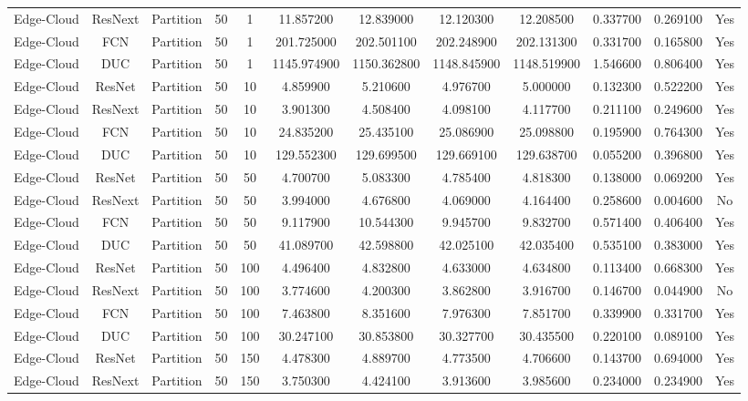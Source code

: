 \begin{tabular}{|c||c||c||c||c||c||c||c||c||c||c||c|}
Edge-Cloud & ResNext & Partition & 50 & 1 & 11.857200 & 12.839000 & 12.120300 & 12.208500 & 0.337700 & 0.269100 & Yes \\
Edge-Cloud & FCN & Partition & 50 & 1 & 201.725000 & 202.501100 & 202.248900 & 202.131300 & 0.331700 & 0.165800 & Yes \\
Edge-Cloud & DUC & Partition & 50 & 1 & 1145.974900 & 1150.362800 & 1148.845900 & 1148.519900 & 1.546600 & 0.806400 & Yes \\
Edge-Cloud & ResNet & Partition & 50 & 10 & 4.859900 & 5.210600 & 4.976700 & 5.000000 & 0.132300 & 0.522200 & Yes \\
Edge-Cloud & ResNext & Partition & 50 & 10 & 3.901300 & 4.508400 & 4.098100 & 4.117700 & 0.211100 & 0.249600 & Yes \\
Edge-Cloud & FCN & Partition & 50 & 10 & 24.835200 & 25.435100 & 25.086900 & 25.098800 & 0.195900 & 0.764300 & Yes \\
Edge-Cloud & DUC & Partition & 50 & 10 & 129.552300 & 129.699500 & 129.669100 & 129.638700 & 0.055200 & 0.396800 & Yes \\
Edge-Cloud & ResNet & Partition & 50 & 50 & 4.700700 & 5.083300 & 4.785400 & 4.818300 & 0.138000 & 0.069200 & Yes \\
Edge-Cloud & ResNext & Partition & 50 & 50 & 3.994000 & 4.676800 & 4.069000 & 4.164400 & 0.258600 & 0.004600 & No \\
Edge-Cloud & FCN & Partition & 50 & 50 & 9.117900 & 10.544300 & 9.945700 & 9.832700 & 0.571400 & 0.406400 & Yes \\
Edge-Cloud & DUC & Partition & 50 & 50 & 41.089700 & 42.598800 & 42.025100 & 42.035400 & 0.535100 & 0.383000 & Yes \\
Edge-Cloud & ResNet & Partition & 50 & 100 & 4.496400 & 4.832800 & 4.633000 & 4.634800 & 0.113400 & 0.668300 & Yes \\
Edge-Cloud & ResNext & Partition & 50 & 100 & 3.774600 & 4.200300 & 3.862800 & 3.916700 & 0.146700 & 0.044900 & No \\
Edge-Cloud & FCN & Partition & 50 & 100 & 7.463800 & 8.351600 & 7.976300 & 7.851700 & 0.339900 & 0.331700 & Yes \\
Edge-Cloud & DUC & Partition & 50 & 100 & 30.247100 & 30.853800 & 30.327700 & 30.435500 & 0.220100 & 0.089100 & Yes \\
Edge-Cloud & ResNet & Partition & 50 & 150 & 4.478300 & 4.889700 & 4.773500 & 4.706600 & 0.143700 & 0.694000 & Yes \\
Edge-Cloud & ResNext & Partition & 50 & 150 & 3.750300 & 4.424100 & 3.913600 & 3.985600 & 0.234000 & 0.234900 & Yes \\

\end{tabular}
